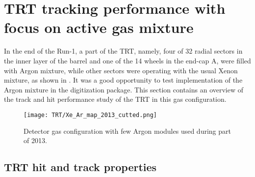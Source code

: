 \section{TRT tracking performance with focus on active gas mixture}
\label{sec:digi_argon}

In the end of the Run-1, a part of the TRT, namely,
four of 32 radial sectors in the inner layer of the barrel and one of the 14 wheels in the end-cap A, were filled with Argon mixture, while other sectors were operating 
with the usual Xenon mixture, as shown in .
It was a good opportunity to test implementation of the Argon mixture in the digitization package.
This section contains an overview of the track and hit performance study of the TRT in this gas configuration.

\begin{figure}
\begin{center}
 \texttt{[image: TRT/Xe\_Ar\_map\_2013\_cutted.png]}
\caption{Detector gas configuration with few Argon modules used during part of 2013.}
\label{fig:argonModulesIn2013}
\end{center}
\end{figure}

\subsection{TRT hit and track properties}

